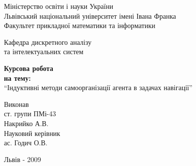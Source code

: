 \titlepage
\begin{center}
	\Large {Міністерство освіти і науки України } \\
	\large {Львівський національний університет імені Івана Франка\\
Факультет прикладної математики та інформатики}\\
\vspace{2cm}
\begin{flushleft}
	\hspace*{9cm}\large{Кафедра дискретного аналізу }\\
	\hspace*{9cm}\large{та інтелектуальних систем}\\
\end{flushleft}
\vspace{2,5cm}
\Huge{\bf{Курсова робота}}\\
\Large{\bf{на тему:}}\\
\LARGE{``Індуктивні методи самоорганізації агента в задачах навігації''}\\
\end{center}
\normalsize

\begin{flushleft}
	\vspace*{5.5cm}
	\hspace*{11cm}Виконав\\
	\hspace*{11cm}ст. групи ПМі-43\\
	\hspace*{11cm}Накрийко А.В.
	\vspace*{1.0cm}\\
	\hspace*{11cm}Науковий керівник\\
	\hspace*{11cm}ас. Годич О.В.\\
	\vspace*{3cm}
\end{flushleft}
\centerline{Львів - 2009}
\thispagestyle{empty}
